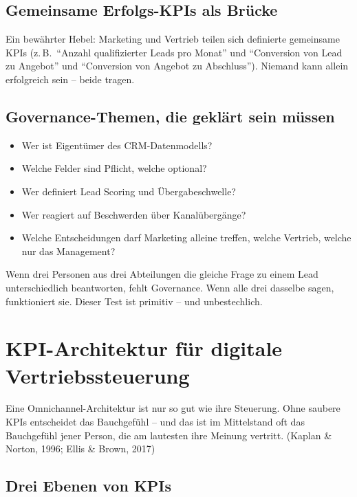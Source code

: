 \documentclass[11pt,a4paper,oneside]{article}
\newcommand{\quelle}[1]{{\footnotesize\color{lpGray}(#1)}}
\begin{document}
\subsection{Gemeinsame Erfolgs-KPIs als Brücke}

Ein bewährter Hebel: Marketing und Vertrieb teilen sich definierte gemeinsame KPIs (z.\,B.\ ``Anzahl qualifizierter Leads pro Monat'' und ``Conversion von Lead zu Angebot'' und ``Conversion von Angebot zu Abschluss''). Niemand kann allein erfolgreich sein -- beide tragen.

\subsection{Governance-Themen, die geklärt sein müssen}

\begin{itemize}
  \item Wer ist Eigentümer des CRM-Datenmodells?
  \item Welche Felder sind Pflicht, welche optional?
  \item Wer definiert Lead Scoring und Übergabeschwelle?
  \item Wer reagiert auf Beschwerden über Kanalübergänge?
  \item Welche Entscheidungen darf Marketing alleine treffen, welche Vertrieb, welche nur das Management?
\end{itemize}

\begin{merkbox}
Wenn drei Personen aus drei Abteilungen die gleiche Frage zu einem Lead unterschiedlich beantworten, fehlt Governance. Wenn alle drei dasselbe sagen, funktioniert sie. Dieser Test ist primitiv -- und unbestechlich.
\end{merkbox}

\section{KPI-Architektur für digitale Vertriebssteuerung}

Eine Omnichannel-Architektur ist nur so gut wie ihre Steuerung. Ohne saubere KPIs entscheidet das Bauchgefühl -- und das ist im Mittelstand oft das Bauchgefühl jener Person, die am lautesten ihre Meinung vertritt. \quelle{Kaplan \& Norton, 1996; Ellis \& Brown, 2017}

\subsection{Drei Ebenen von KPIs}
\end{document}
